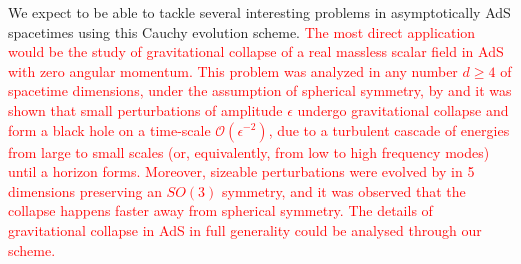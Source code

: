 \documentclass[a4paper,11pt]{article}
\numberwithin{equation}{section}
\begin{document}
We expect to be able to tackle several interesting problems in asymptotically AdS spacetimes using this Cauchy evolution scheme. \textcolor{red}{The most direct application would be the study of gravitational collapse of a real massless scalar field in AdS with zero angular momentum.
This problem was analyzed in any number $d\geq 4$ of spacetime dimensions, under the assumption of spherical symmetry, by \cite{Bizon:2011gg,Jalmuzna:2011qw} and it was shown that small perturbations of amplitude $\epsilon$ undergo gravitational collapse and form a black hole on a time-scale $\mathcal{O}(\epsilon^{-2})$, due to a turbulent cascade of energies from large to small scales (or, equivalently, from low to high frequency modes) until a horizon forms.
Moreover, sizeable perturbations were evolved by \cite{Bantilan:2017kok} in 5 dimensions preserving an $SO(3)$ symmetry, and it was observed that the collapse happens faster away from spherical symmetry.
The details of gravitational collapse in AdS in full generality could be analysed through our scheme.
}

\end{document}
